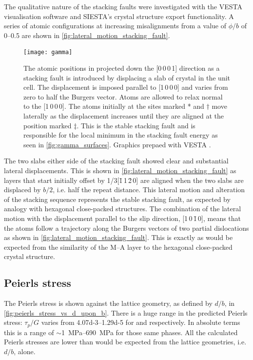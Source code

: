 The qualitative nature of the stacking faults were investigated with the VESTA visualisation software and SIESTA's crystal structure export functionality. A series of atomic configurations at increasing misalignments from a value of $\phi/b$ of \numrange{0}{0.5} are shown in \autoref{fig:lateral_motion_stacking_fault}.


\begin{figure}[!ht]
\centering
\texttt{[image: gamma]}
\captionsetup{width=0.9\textwidth}
\caption[Atomic configurations around stacking faults.]{The atomic positions in  projected down the [0\,0\,0\,1] direction as a stacking fault is introduced by displacing a slab of crystal in the unit cell. The displacement is imposed  parallel to [1\,0\,0\,0] and varies from zero to half the Burgers vector. Atoms are allowed to relax normal to the [1\,0\,0\,0]. The atoms initially at the sites marked * and $\dagger$ move laterally as the displacement increases until they are aligned at the position marked $\ddagger$. This is the stable stacking fault and is responsible for the local minimum in the stacking fault energy as seen in \autoref{fig:gamma_surfaces}. Graphics prepaed with VESTA \cite{Momma2011}.\label{fig:lateral_motion_stacking_fault}}
\end{figure}




The two slabs either side of the stacking fault showed clear and substantial lateral displacements. This is shown in \autoref{fig:lateral_motion_stacking_fault} as layers that start initially offset by 1/3[\={1}\,1\,\=2\,0] are aligned when the two slabs are displaced by $b/2$, i.e. half the repeat distance. This lateral motion and alteration of the stacking sequence represents the stable stacking fault, as expected by analogy with hexagonal close-packed structures. The combination of the lateral motion with the displacement parallel to the slip direction, [1\,0\,\={1}\,0], means that the atoms follow a trajectory along the Burgers vectors of two partial dislocations as shown in \autoref{fig:lateral_motion_stacking_fault}. This is exactly as would be expected from the similarity of the M--A layer to the hexagonal close-packed crystal structure. 


\subsection{Peierls stress}

The Peierls stress is shown against the lattice geometry, as defined by $d/b$, in \autoref{fig:peierls_stress_vs_d_upon_b}. There is a huge range in the predicted Peierls stress: $\tau_p / G$ varies from \numrange{4.07d-3}{1.29d-5} for  and  respectively. In absolute terms this is a range of $\sim$\SIrange{1}{690}{\mega\pascal} for those same phases. All the calculated Peierls stresses are lower than would be expected from the lattice geometries, i.e. $d/b$, alone.



